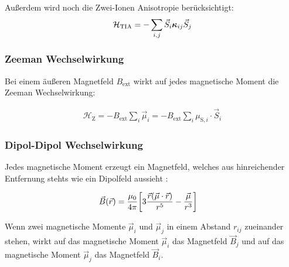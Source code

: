 \documentclass[main.tex]{subfiles}
\begin{document}
Außerdem wird noch die Zwei-Ionen Anisotropie berücksichtigt:
\begin{align}
	\mathcal{H}_{\text{TIA}} = -\sum_{i,j} \vec{S}_i \bm{\mathrm{\kappa}}_{ij}
	\vec{S}_j\label{eq:hamilton-tia}
\end{align}
\subsubsection*{Zeeman Wechselwirkung}
Bei einem äußeren Magnetfeld \(B_\text{ext}\) wirkt auf jedes magnetische
Moment die Zeeman Wechselwirkung:

\begin{align}
	\mathcal{H}_{\text{Z}} = - B_\text{ext} \sum_{i} \vec{\mu}_i = -
	B_\text{ext} \sum_{i} \mu_{\text{S},i} \cdot
	\vec{S}_i\label{eq:hamilton-zeeman}
\end{align}


\subsubsection*{Dipol-Dipol Wechselwirkung}

Jedes magnetische Moment erzeugt ein Magnetfeld, welches aus hinreichender
Entfernung stehts wie ein Dipolfeld aussieht \cite{Nolting-3-elektrodynamik}:

\begin{align}
	\vec{B}(\vec{r}) & = \frac{\mu_0}{4\pi} \qty[3 \frac{\vec{r}(\vec{\mu}
			\cdot
			\vec{r})}{r^5} -
		\frac{\vec{\mu}}{r^3}]\label{eq:dipolmoment}
\end{align}

Wenn zwei magnetische Momente \(\vec{\mu}_i\) und \(\vec{\mu}_j\) in einem
Abstand \(r_{ij}\) zueinander stehen, wirkt auf das magnetische Moment
\(\vec{\mu}_i\) das Magnetfeld \(\vec{B}_j\) und auf das magnetische Moment
\(\vec{\mu}_j\) das Magnetfeld \(\vec{B}_i\).


\end{document}
